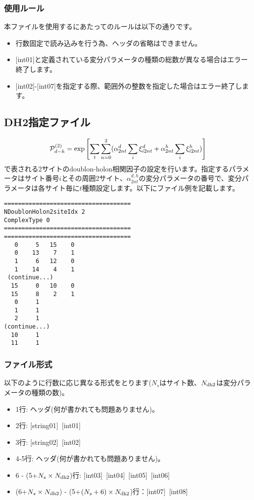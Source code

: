 \subsubsection{使用ルール}
本ファイルを使用するにあたってのルールは以下の通りです。
\begin{itemize}
\item 行数固定で読み込みを行う為、ヘッダの省略はできません。
\item $[$int01$]$と定義されている変分パラメータの種類の総数が異なる場合はエラー終了します。
\item $[$int02$]$-$[$int07$]$を指定する際、範囲外の整数を指定した場合はエラー終了します。
\end{itemize}

\newpage
\subsection{DH2指定ファイル}
\label{Subsec:DH2}

\begin{equation}
{\cal P}_{d-h}^{(2)}= \exp \left[ \sum_t \sum_{n=0}^2 (\alpha_{2nt}^d \sum_{i}\xi_{i2nt}^d+\alpha_{2nt}^h \sum_{i}\xi_{i2nt}^h)\right]
\end{equation}
で表される2サイトのdoublon-holon相関因子の設定を行います。指定するパラメータはサイト番号$i$とその周囲2サイト、$\alpha_{2nt}^{d,h}$の変分パラメータの番号で、変分パラメータは各サイト毎に$t$種類設定します。以下にファイル例を記載します。

\begin{minipage}{12.5cm}
\begin{screen}
\begin{verbatim}
====================================
NDoublonHolon2siteIdx 2  
ComplexType 0
====================================
====================================
   0     5   15    0
   0    13    7    1
   1     6   12    0
   1    14    4    1
 (continue...)
  15     0   10    0
  15     8    2    1
   0     1 
   1     1 
   2     1 
(continue...)
  10     1 
  11     1 
\end{verbatim}
\end{screen}
\end{minipage}

\subsubsection{ファイル形式}
以下のように行数に応じ異なる形式をとります($N_s$はサイト数、$N_{\rm dh2}$は変分パラメータの種類の数)。
 \begin{itemize}
   \item  1行:  ヘッダ(何が書かれても問題ありません)。
   \item  2行:   [string01]~[int01]
   \item  3行:   [string02]~[int02]
   \item  4-5行:  ヘッダ(何が書かれても問題ありません)。
   \item  6 - (5+$N_s\times N_{\rm dh2}$)行: [int03]~[int04]~[int05]~[int06]
   \item  (6+$N_s\times N_{\rm dh2}$) - (5+$(N_s+6) \times N_{\rm dh2}$)行：[int07]~[int08]
  \end{itemize}
